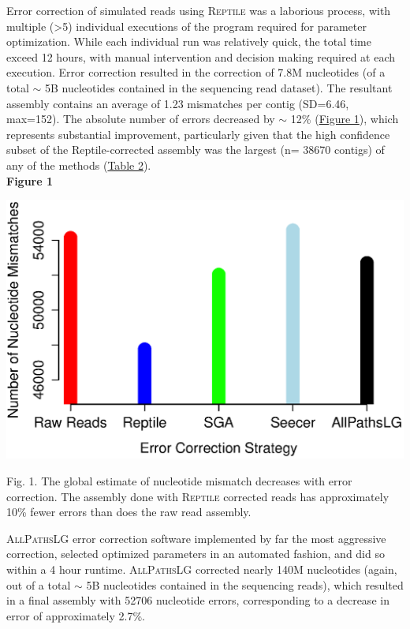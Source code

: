 \documentclass[11pt]{article}
\begin{document}
\noindent
Error correction of simulated reads using \textsc{Reptile} was a laborious process, with multiple (\textgreater 5) individual executions of the program required for parameter optimization. While each individual run was relatively quick, the total time exceed 12 hours, with manual intervention and decision making required at each execution.  Error correction resulted in the correction of 7.8M nucleotides (of a total $\sim$ 5B nucleotides contained in the sequencing read dataset). The resultant assembly contains an average of 1.23 mismatches per contig (SD=6.46, max=152).  The absolute number of errors decreased by $\sim$ 12\% (\hyperlink{Figure 1}{Figure 1}), which represents substantial improvement, particularly given that the high confidence subset of the Reptile-corrected assembly was the largest (n= 38670 contigs) of any of the methods (\hyperlink{Table 2}{Table 2}). \\

\textbf{\hypertarget{Figure 1}{Figure 1}} \\
\centerline{\includegraphics[width=12.0\baselineskip]{newfig2b.eps}}
\begin{changemargin}{2cm}{2cm}
\noindent
Fig. 1. The global estimate of nucleotide mismatch decreases with error correction. The assembly done with \textsc{Reptile} corrected reads has approximately 10\% fewer errors than does the raw read assembly. 
\end{changemargin}
\vspace{10mm}


\noindent
\textsc{AllPathsLG} error correction software implemented by far the most aggressive correction, selected optimized parameters in an automated fashion, and did so within a 4 hour runtime.  \textsc{AllPathsLG} corrected nearly 140M nucleotides (again, out of a total $\sim$ 5B nucleotides contained in the sequencing reads), which resulted in a final assembly with 52706 nucleotide errors, corresponding to a decrease in error of approximately 2.7\%.   \\
\end{document}

